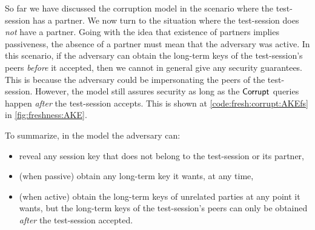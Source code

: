 So far we have discussed the \akefstext corruption model in the scenario where the test-session has a partner.
We now turn to the situation where the test-session does \emph{not} have a partner.
Going with the idea that existence of partners implies passiveness,
the absence of a partner must mean that the adversary was active. 
In this scenario,
if the adversary can obtain the long-term keys of the test-session's peers \emph{before} it accepted,
then we cannot in general give any security guarantees.
This is because the adversary could be impersonating the peers of the test-session.
However,
the \akefstext model still assures security as long as the $\mathsf{Corrupt}$ queries happen \emph{after} the test-session accepts.
This is shown at \cref{code:fresh:corrupt:AKEfs} in \cref{fig:freshness:AKE}.

To summarize,
in the \akefstext model the adversary can:
\begin{itemize}
	\item reveal any session key that does not belong to the test-session or its partner,

	\item (when passive) obtain any long-term key it wants,
	at any time,
	
	\item (when active) obtain the long-term keys of unrelated parties at any point it wants,
	but the long-term keys of the test-session's peers can only be obtained \emph{after} the test-session accepted.
\end{itemize}


